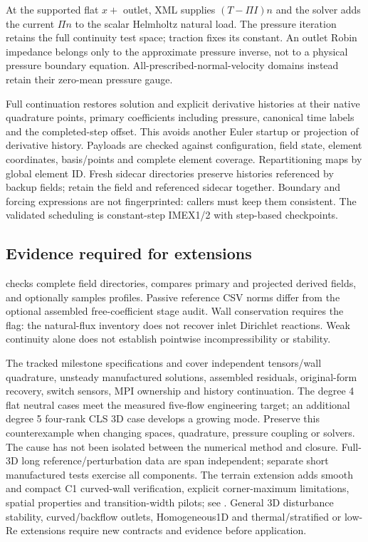 At the supported flat $x+$ outlet, XML supplies $(T-\Pi I)n$ and the solver
adds the current $\Pi n$ to the scalar Helmholtz natural load. The pressure
iteration retains the full continuity test space; traction fixes its constant.
An outlet Robin impedance belongs only to the approximate pressure inverse,
not to a physical pressure boundary equation. All-prescribed-normal-velocity
domains instead retain their zero-mean pressure gauge.

Full continuation restores solution and explicit derivative histories at their
native quadrature points, primary coefficients including pressure, canonical
time labels and the completed-step offset. This avoids another Euler startup
or projection of derivative history. Payloads are checked against configuration,
field state, element coordinates, basis/points and complete element coverage.
Repartitioning maps by global element ID. Fresh sidecar directories preserve
histories referenced by backup fields; retain the field and referenced sidecar
together. Boundary and forcing expressions are not fingerprinted: callers must
keep them consistent. The validated scheduling is constant-step IMEX1/2 with
step-based checkpoints.

\subsection{Evidence required for extensions}

 checks complete field directories, compares primary and
projected derived fields, and optionally samples profiles. Passive reference
CSV norms differ from the optional assembled free-coefficient stage audit.
Wall conservation requires the  flag: the natural-flux
inventory does not recover inlet Dirichlet reactions. Weak continuity alone
does not establish pointwise incompressibility or stability.

The tracked milestone specifications and  cover independent
tensors/wall quadrature, unsteady manufactured solutions, assembled residuals,
original-form recovery, switch sensors, MPI ownership and history continuation.
The degree 4 flat neutral cases meet the measured five-flow engineering target;
an additional degree 5 four-rank CLS 3D case develops a growing mode. Preserve this
counterexample when changing spaces, quadrature, pressure coupling or solvers.
The cause has not been isolated between the numerical method and closure.
Full-3D long reference/perturbation data are span independent; separate short
manufactured tests exercise all components. The terrain extension adds smooth
and compact C1 curved-wall verification, explicit corner-maximum limitations,
spatial properties and transition-width pilots; see
.
General 3D disturbance stability,
curved/backflow outlets, Homogeneous1D and thermal/stratified
or low-Re extensions require new contracts and evidence before application.
